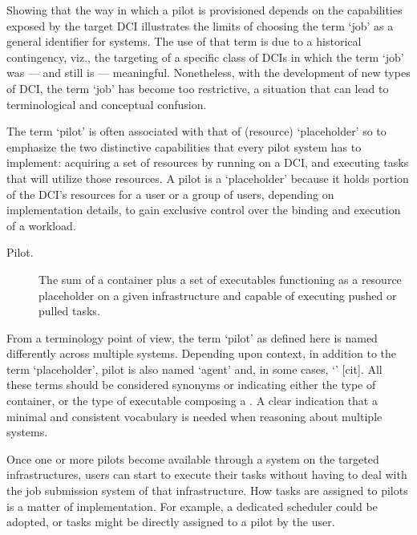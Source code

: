 \documentclass{sig-alternate}
\begin{document}
Showing that the way in which a pilot is provisioned depends on the
capabilities exposed by the target DCI illustrates the limits of
choosing the term `job' as a general identifier for \pilotjob systems.
The use of that term is due to a historical contingency, viz., the
targeting of a specific class of DCIs in which the term `job' was ---
and still is --- meaningful. Nonetheless, with the development of new
types of DCI, the term `job' has become too restrictive, a situation
that can lead to terminological and conceptual confusion.

The term `pilot' is often associated with that of (resource)
`placeholder' so to emphasize the two distinctive capabilities that
every pilot system has to implement: acquiring a set of resources by
running on a DCI, and executing tasks that will utilize those resources.
A pilot is a `placeholder' because it holds portion of the DCI's
resources for a user or a group of users, depending on implementation
details, to gain exclusive control over the binding and execution of a
workload.

\begin{description}

\item[Pilot.] The sum of a container plus a set of executables functioning as a
resource placeholder on a given infrastructure and capable of executing pushed
or pulled tasks. 


\end{description}

From a terminology point of view, the term `pilot' as defined here is
named differently across multiple \pilotjob systems. Depending upon
context, in addition to the term `placeholder', pilot is also named
`agent' and, in some cases, `\pilotjob' [cit]. All these terms should be
considered synonyms or indicating either the type of container, or the
type of executable composing a \pilot. A clear indication that a minimal
and consistent vocabulary is needed when reasoning about multiple
\pilotjob systems.

Once one or more pilots become available through a \pilotjob system on the
targeted infrastructures, users can start to execute their tasks without
having to deal with the job submission system of that infrastructure.
How tasks are assigned to pilots is a matter of implementation. For example, a
dedicated scheduler could be adopted, or tasks might be directly assigned to a
pilot by the user.
\end{document}
